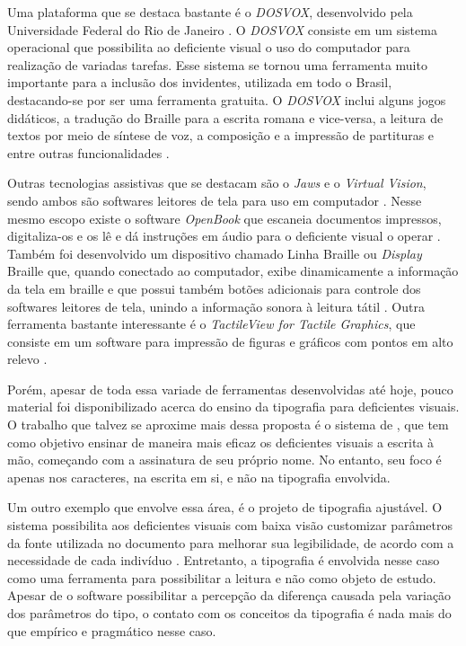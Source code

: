 Uma plataforma que se destaca bastante é o \textit{DOSVOX}, desenvolvido pela Universidade Federal do Rio de Janeiro . O \textit{DOSVOX} consiste em um sistema operacional que possibilita ao deficiente visual o uso do computador para realização de variadas tarefas. Esse sistema se tornou uma ferramenta muito importante para a inclusão dos invidentes, utilizada em todo o Brasil, destacando-se por ser uma ferramenta gratuita. O \textit{DOSVOX} inclui alguns jogos didáticos, a tradução do Braille para a escrita romana e vice-versa, a leitura de textos por meio de síntese de voz, a composição e a impressão de partituras e entre outras funcionalidades .

Outras tecnologias assistivas que se destacam são o \textit{Jaws} e o \textit{Virtual Vision}, sendo ambos são softwares leitores de tela para uso em computador  . Nesse mesmo escopo existe o software \textit{OpenBook} que escaneia documentos impressos, digitaliza-os e os lê e dá instruções em áudio para o deficiente visual o operar . Também foi desenvolvido um dispositivo chamado Linha Braille ou \textit{Display} Braille que, quando conectado ao computador, exibe dinamicamente a informação da tela em braille e que possui também botões adicionais para controle dos softwares leitores de tela, unindo a informação sonora à leitura tátil . Outra ferramenta bastante interessante é o \textit{TactileView for Tactile Graphics}, que consiste em um software para impressão de figuras e gráficos com pontos em alto relevo  .

Porém, apesar de toda essa variade de ferramentas desenvolvidas até hoje, pouco material foi disponibilizado acerca do ensino da tipografia para deficientes visuais. O trabalho que talvez se aproxime mais dessa proposta é o sistema de , que tem como objetivo ensinar de maneira mais eficaz os deficientes visuais a escrita à mão, começando com a assinatura de seu próprio nome. No entanto, seu foco é apenas nos caracteres, na escrita em si, e não na tipografia envolvida.

Um outro exemplo que envolve essa área, é o projeto de tipografia ajustável. O sistema possibilita aos deficientes visuais com baixa visão customizar parâmetros da fonte utilizada no documento para melhorar sua legibilidade, de acordo com a necessidade de cada indivíduo . Entretanto, a tipografia é envolvida nesse caso como uma ferramenta para possibilitar a leitura e não como objeto de estudo. Apesar de o software possibilitar a percepção da diferença causada pela variação dos parâmetros do tipo, o contato com os conceitos da tipografia é nada mais do que empírico e pragmático nesse caso.

